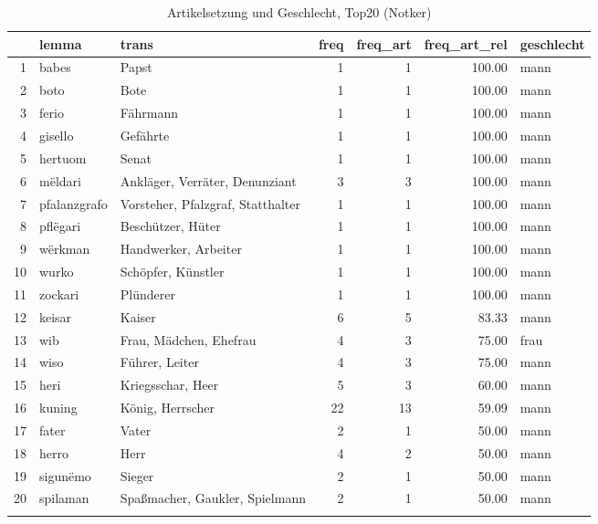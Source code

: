 \begin{table}[ht]
\centering
\begin{tabular}{rllrrrl}
  \lsptoprule
 & lemma & trans & freq & freq\_art & freq\_art\_rel & geschlecht \\ 
  \midrule
1 & babes & Papst &   1 &   1 & 100.00 & mann \\ 
  2 & boto & Bote &   1 &   1 & 100.00 & mann \\ 
  3 & ferio & Fährmann &   1 &   1 & 100.00 & mann \\ 
  4 & gisello & Gefährte &   1 &   1 & 100.00 & mann \\ 
  5 & hertuom & Senat &   1 &   1 & 100.00 & mann \\ 
  6 & mëldari & Ankläger, Verräter, Denunziant &   3 &   3 & 100.00 & mann \\ 
  7 & pfalanzgrafo & Vorsteher, Pfalzgraf, Statthalter &   1 &   1 & 100.00 & mann \\ 
  8 & pflëgari & Beschützer, Hüter &   1 &   1 & 100.00 & mann \\ 
  9 & wërkman & Handwerker, Arbeiter &   1 &   1 & 100.00 & mann \\ 
  10 & wurko & Schöpfer, Künstler &   1 &   1 & 100.00 & mann \\ 
  11 & zockari & Plünderer &   1 &   1 & 100.00 & mann \\ 
  12 & keisar & Kaiser &   6 &   5 & 83.33 & mann \\ 
  13 & wib & Frau, Mädchen, Ehefrau &   4 &   3 & 75.00 & frau \\ 
  14 & wiso & Führer, Leiter &   4 &   3 & 75.00 & mann \\ 
  15 & heri & Kriegsschar, Heer &   5 &   3 & 60.00 & mann \\ 
  16 & kuning & König, Herrscher &  22 &  13 & 59.09 & mann \\ 
  17 & fater & Vater &   2 &   1 & 50.00 & mann \\ 
  18 & herro & Herr &   4 &   2 & 50.00 & mann \\ 
  19 & sigunëmo & Sieger &   2 &   1 & 50.00 & mann \\ 
  20 & spilaman & Spaßmacher, Gaukler, Spielmann &   2 &   1 & 50.00 & mann \\ 
   \lspbottomrule
\end{tabular}
\caption{Artikelsetzung und Geschlecht, Top20  (Notker)} 
\end{table}
